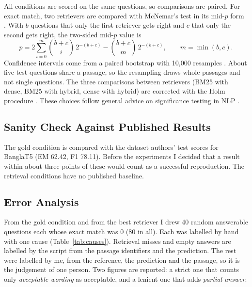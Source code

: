 All conditions are scored on the same questions, so comparisons are paired. For exact match, two retrievers are compared with McNemar's test in its mid-$p$ form \cite{fagerland2013mcnemar}. With $b$ questions that only the first retriever gets right and $c$ that only the second gets right, the two-sided mid-$p$ value is
\begin{equation}
	p = 2\sum_{i=0}^{m} \binom{b+c}{i}\,2^{-(b+c)} - \binom{b+c}{m}\,2^{-(b+c)}, \qquad m = \min(b, c).
\end{equation}
Confidence intervals come from a paired bootstrap with 10,000 resamples \cite{efron1979bootstrap, berg2012empirical}. About five test questions share a passage, so the resampling draws whole passages and not single questions. The three comparisons between retrievers (BM25 with dense, BM25 with hybrid, dense with hybrid) are corrected with the Holm procedure \cite{holm1979simple}. These choices follow general advice on significance testing in NLP \cite{dror2018hitchhiker}.

\subsection{Sanity Check Against Published Results}

The gold condition is compared with the dataset authors' test scores for BanglaT5 (EM 62.42, F1 78.11). Before the experiments I decided that a result within about three points of these would count as a successful reproduction. The retrieval conditions have no published baseline.

\subsection{Error Analysis}

From the gold condition and from the best retriever I drew 40 random answerable questions each whose exact match was 0 (80 in all). Each was labelled by hand with one cause (Table~\ref{tab:causes}). Retrieval misses and empty answers are labelled by the script from the passage identifiers and the prediction. The rest were labelled by me, from the reference, the prediction and the passage, so it is the judgement of one person. Two figures are reported: a strict one that counts only \emph{acceptable wording} as acceptable, and a lenient one that adds \emph{partial answer}.


